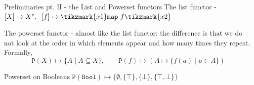 \documentclass[aspectratio=169]{beamer}
\begin{document}
\begin{frame}{Preliminaries pt. II - the List and Powerset functors}
  The list functor - $[X] \mapsto X^\ast, \hspace{0.2cm} [f] \mapsto \tikzmark{x1}
  \prog{map}\ f \tikzmark{x2}$

  \vspace{1cm}
  The powerset functor - almost like the list functor; the difference
  is that we do not look at the order in which elements appear and
  how many times they repeat. Formally,
  \[
    \texttt{P}(X) \mapsto \{ A \mid A \subseteq X \}, \qquad
    \texttt{P}(f) \mapsto (A \mapsto \{ f(a) \mid a \in A \})
  \]

  \begin{exampleblock}{\exercise Powerset on Booleans}
    $\texttt{P}(\mathtt{Bool}) \mapsto \{ \emptyset, \{ \top \}, \{ \bot \}, \{ \top, \bot \} \}$
  \end{exampleblock}
  

\end{frame}
\end{document}

